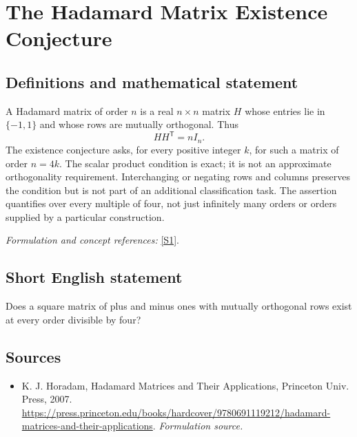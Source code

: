 \documentclass[11pt]{article}
\begin{document}
\section*{\texorpdfstring{The Hadamard Matrix Existence Conjecture}{The Hadamard Matrix Existence Conjecture}}\label{338}
\subsection{Definitions and mathematical statement}
A Hadamard matrix of order $n$ is a real $n\times n$ matrix $H$ whose entries lie in $\{-1,1\}$ and whose rows are mutually orthogonal. Thus
\[
 HH^{\mathsf T}=nI_n.
\]
The existence conjecture asks, for every positive integer $k$, for such a matrix of order $n=4k$. The scalar product condition is exact; it is not an approximate orthogonality requirement. Interchanging or negating rows and columns preserves the condition but is not part of an additional classification task. The assertion quantifies over every multiple of four, not just infinitely many orders or orders supplied by a particular construction.
\par\smallskip\textit{Formulation and concept references:} \href{https://press.princeton.edu/books/hardcover/9780691119212/hadamard-matrices-and-their-applications}{[S1]}.

\subsection{Short English statement}
Does a square matrix of plus and minus ones with mutually orthogonal rows exist at every order divisible by four?
\subsection{Sources}
\begin{itemize}
\item[S1]K. J. Horadam, Hadamard Matrices and Their Applications, Princeton Univ. Press, 2007.
\url{https://press.princeton.edu/books/hardcover/9780691119212/hadamard-matrices-and-their-applications}.
\textit{Formulation source.}
\end{itemize}
\end{document}
